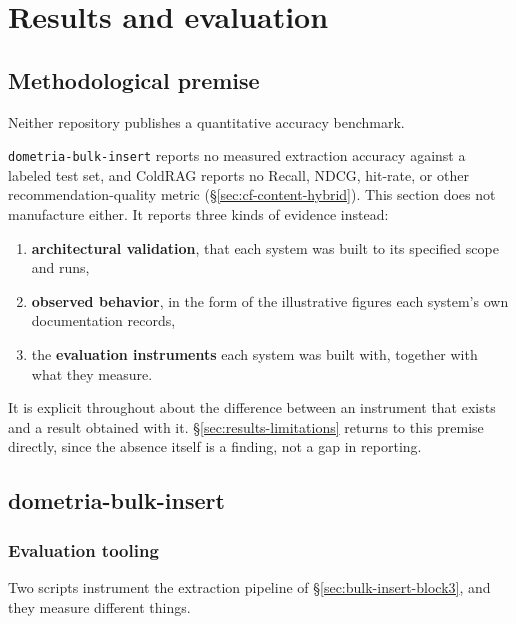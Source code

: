 \chapter{Results and evaluation}
\label{sec:conclusions-results}


\section{Methodological premise}
\label{sec:results-premise}

Neither repository publishes a quantitative accuracy benchmark. 


\texttt{dometria-bulk-insert} reports no measured extraction accuracy against a labeled test set, and ColdRAG reports no Recall, NDCG, hit-rate, or other recommendation-quality metric (\S\ref{sec:cf-content-hybrid}). This section does not manufacture either. It reports three kinds of evidence instead: 
\begin{enumerate}
\item \textbf{architectural validation}, that each system was built to its specified scope and runs,
\item \textbf{observed behavior}, in the form of the illustrative figures each system's own documentation records, 
\item the \textbf{evaluation instruments} each system was built with, together with what they measure. 
\end{enumerate}
It is explicit throughout about the difference between an instrument that exists and a result obtained with it. \S\ref{sec:results-limitations} returns to this premise directly, since the absence itself is a finding, not a gap in reporting.

\section{dometria-bulk-insert}
\label{sec:results-bulk-insert}

\subsection{Evaluation tooling}
\label{sec:results-bulk-insert-tooling}

Two scripts instrument the extraction pipeline of \S\ref{sec:bulk-insert-block3}, and they measure different things.


